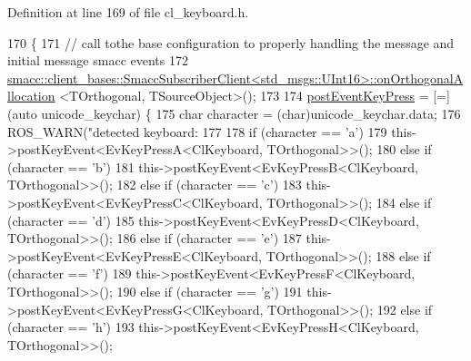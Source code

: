 Definition at line 169 of file cl\+\_\+keyboard.\+h.


\begin{DoxyCode}
170         \{
171                 \textcolor{comment}{// call tothe base configuration to properly handling the message and initial message smacc
       events}
172                 
      \hyperlink{classsmacc_1_1client__bases_1_1SmaccSubscriberClient}{smacc::client\_bases::SmaccSubscriberClient<std\_msgs::UInt16>::onOrthogonalAllocation}
      <TOrthogonal, TSourceObject>();
173 
174                 \hyperlink{classcl__keyboard_1_1ClKeyboard_ae9811fd50207ba9b69a4f27e7f8b4e86}{postEventKeyPress} = [=](\textcolor{keyword}{auto} unicode\_keychar) \{
175                         \textcolor{keywordtype}{char} character = (char)unicode\_keychar.data;
176                         ROS\_WARN(\textcolor{stringliteral}{"detected keyboard: %
177 
178                         \textcolor{keywordflow}{if} (character == \textcolor{charliteral}{'a'})
179                                 this->postKeyEvent<EvKeyPressA<ClKeyboard, TOrthogonal>>();
180                         \textcolor{keywordflow}{else} \textcolor{keywordflow}{if} (character == \textcolor{charliteral}{'b'})
181                                 this->postKeyEvent<EvKeyPressB<ClKeyboard, TOrthogonal>>();
182                         \textcolor{keywordflow}{else} \textcolor{keywordflow}{if} (character == \textcolor{charliteral}{'c'})
183                                 this->postKeyEvent<EvKeyPressC<ClKeyboard, TOrthogonal>>();
184                         \textcolor{keywordflow}{else} \textcolor{keywordflow}{if} (character == \textcolor{charliteral}{'d'})
185                                 this->postKeyEvent<EvKeyPressD<ClKeyboard, TOrthogonal>>();
186                         \textcolor{keywordflow}{else} \textcolor{keywordflow}{if} (character == \textcolor{charliteral}{'e'})
187                                 this->postKeyEvent<EvKeyPressE<ClKeyboard, TOrthogonal>>();
188                         \textcolor{keywordflow}{else} \textcolor{keywordflow}{if} (character == \textcolor{charliteral}{'f'})
189                                 this->postKeyEvent<EvKeyPressF<ClKeyboard, TOrthogonal>>();
190                         \textcolor{keywordflow}{else} \textcolor{keywordflow}{if} (character == \textcolor{charliteral}{'g'})
191                                 this->postKeyEvent<EvKeyPressG<ClKeyboard, TOrthogonal>>();
192                         \textcolor{keywordflow}{else} \textcolor{keywordflow}{if} (character == \textcolor{charliteral}{'h'})
193                                 this->postKeyEvent<EvKeyPressH<ClKeyboard, TOrthogonal>>();
}
\end{DoxyCode}
